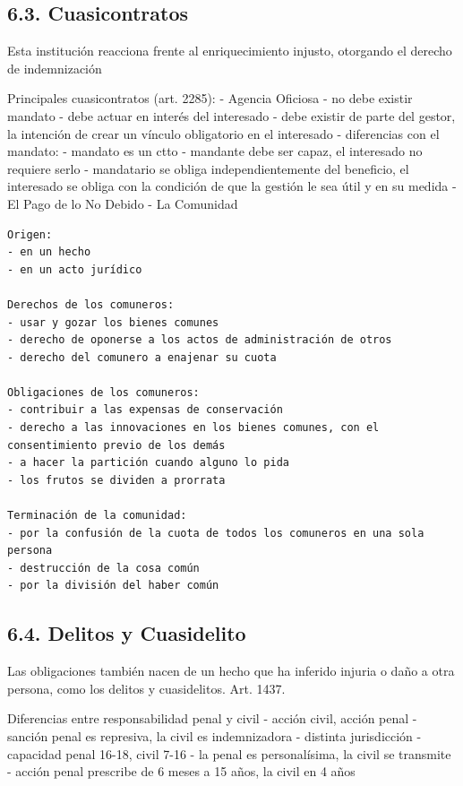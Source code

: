 \documentclass[]{article}
\begin{document}
\hypertarget{cuasicontratos}{%
\subsection{6.3. Cuasicontratos}\label{cuasicontratos}}

Esta institución reacciona frente al enriquecimiento injusto, otorgando
el derecho de indemnización

Principales cuasicontratos (art. 2285): - Agencia Oficiosa - no debe
existir mandato - debe actuar en interés del interesado - debe existir
de parte del gestor, la intención de crear un vínculo obligatorio en el
interesado - diferencias con el mandato: - mandato es un ctto - mandante
debe ser capaz, el interesado no requiere serlo - mandatario se obliga
independientemente del beneficio, el interesado se obliga con la
condición de que la gestión le sea útil y en su medida - El Pago de lo
No Debido - La Comunidad

\begin{verbatim}
Origen:
- en un hecho
- en un acto jurídico

Derechos de los comuneros:
- usar y gozar los bienes comunes
- derecho de oponerse a los actos de administración de otros
- derecho del comunero a enajenar su cuota

Obligaciones de los comuneros:
- contribuir a las expensas de conservación
- derecho a las innovaciones en los bienes comunes, con el consentimiento previo de los demás
- a hacer la partición cuando alguno lo pida
- los frutos se dividen a prorrata

Terminación de la comunidad:
- por la confusión de la cuota de todos los comuneros en una sola persona
- destrucción de la cosa común
- por la división del haber común
\end{verbatim}

\hypertarget{delitos-y-cuasidelito}{%
\subsection{6.4. Delitos y Cuasidelito}\label{delitos-y-cuasidelito}}

Las obligaciones también nacen de un hecho que ha inferido injuria o
daño a otra persona, como los delitos y cuasidelitos. Art. 1437.

Diferencias entre responsabilidad penal y civil - acción civil, acción
penal - sanción penal es represiva, la civil es indemnizadora - distinta
jurisdicción - capacidad penal 16-18, civil 7-16 - la penal es
personalísima, la civil se transmite - acción penal prescribe de 6 meses
a 15 años, la civil en 4 años
\end{document}

